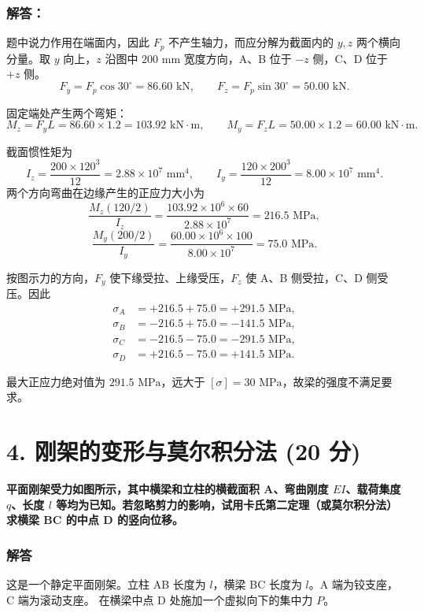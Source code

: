 \documentclass[11pt,a4paper]{ctexrep}
\begin{document}
{\subsubsection*{解答：}

题中说力作用在端面内，因此 $F_p$ 不产生轴力，而应分解为截面内的 $y,z$ 两个横向分量。取 $y$ 向上，$z$ 沿图中 $200\text{ mm}$ 宽度方向，A、B 位于 $-z$ 侧，C、D 位于 $+z$ 侧。
\[
F_y=F_p\cos30^\circ=86.60\text{ kN},\qquad
F_z=F_p\sin30^\circ=50.00\text{ kN}.
\]

固定端处产生两个弯矩：
\[
M_z=F_yL=86.60\times 1.2=103.92\text{ kN}\cdot\text{m},\qquad
M_y=F_zL=50.00\times 1.2=60.00\text{ kN}\cdot\text{m}.
\]

截面惯性矩为
\[
I_z=\frac{200\times120^3}{12}=2.88\times10^7\text{ mm}^4,\qquad
I_y=\frac{120\times200^3}{12}=8.00\times10^7\text{ mm}^4.
\]
两个方向弯曲在边缘产生的正应力大小为
\[
\frac{M_z(120/2)}{I_z}
=\frac{103.92\times10^6\times60}{2.88\times10^7}
=216.5\text{ MPa},
\]
\[
\frac{M_y(200/2)}{I_y}
=\frac{60.00\times10^6\times100}{8.00\times10^7}
=75.0\text{ MPa}.
\]

按图示力的方向，$F_y$ 使下缘受拉、上缘受压，$F_z$ 使 A、B 侧受拉，C、D 侧受压。因此
\[
\begin{aligned}
\sigma_A&=+216.5+75.0=+291.5\text{ MPa},\\
\sigma_B&=-216.5+75.0=-141.5\text{ MPa},\\
\sigma_C&=-216.5-75.0=-291.5\text{ MPa},\\
\sigma_D&=+216.5-75.0=+141.5\text{ MPa}.
\end{aligned}
\]

最大正应力绝对值为 $291.5\text{ MPa}$，远大于 $[\sigma]=30\text{ MPa}$，故梁的强度不满足要求。




\section*{4. 刚架的变形与莫尔积分法 (20 分)}

\textbf{平面刚架受力如图所示，其中横梁和立柱的横截面积 A、弯曲刚度 $EI$、载荷集度 $q$、长度 $l$ 等均为已知。若忽略剪力的影响，试用卡氏第二定理（或莫尔积分法）求横梁 BC 的中点 D 的竖向位移。}

\subsubsection*{解答}

这是一个静定平面刚架。立柱 AB 长度为 $l$，横梁 BC 长度为 $l$。A 端为铰支座，C 端为滚动支座。
在横梁中点 D 处施加一个虚拟向下的集中力 $P$。

}
\end{document}
